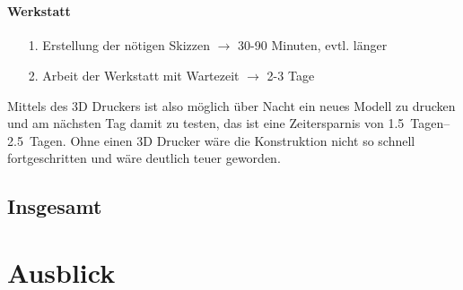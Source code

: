 \hfill \\

\paragraph{Werkstatt}
\begin{itemize}
	\item[1.] Erstellung der nötigen Skizzen $\rightarrow$ 30-90 Minuten, evtl. länger
	\item[2.] Arbeit der Werkstatt mit Wartezeit $\rightarrow$ 2-3 Tage
\end{itemize}

\vspace{0.5cm}

Mittels des 3D Druckers ist also möglich über Nacht ein neues Modell zu drucken und am nächsten Tag damit zu testen, das ist eine Zeitersparnis von \SIrange{1,5}{2,5}{Tagen}. Ohne einen 3D Drucker wäre die Konstruktion nicht so schnell fortgeschritten und wäre deutlich teuer geworden. 



\subsection{Insgesamt}








\section{Ausblick}












